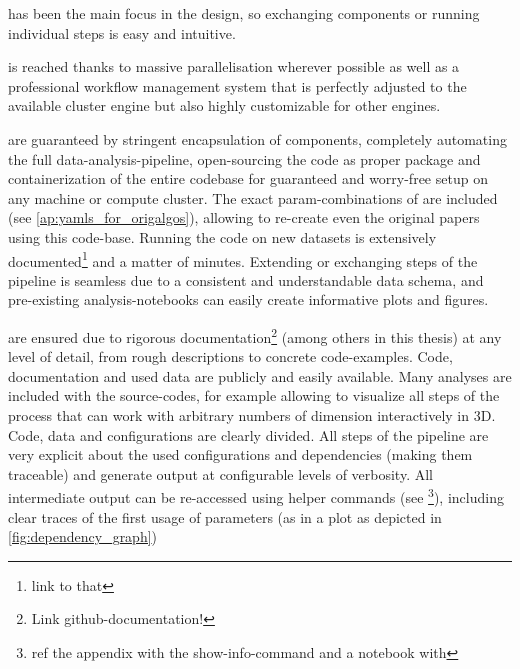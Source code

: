 \begin{description}[style=unboxed]
	\item[Modularity] has been the main focus in the design, so exchanging components or running individual steps is easy and intuitive.
	\item[Scalability] is reached thanks to massive parallelisation wherever possible as well as a professional workflow management system that is perfectly adjusted to the available cluster engine but also highly customizable for other engines.
	\item[Reproducibility and Adaptability] are guaranteed by stringent encapsulation of components, completely automating the full data-analysis-pipeline, open-sourcing the code as proper package and containerization of the entire codebase for guaranteed and worry-free setup on any machine or compute cluster. The exact \gls{param}-combinations of \mainalgos are included (see \autoref{ap:yamls_for_origalgos}), allowing to re-create even the original papers using this code-base. Running the code on new datasets is extensively documented\footnote{ link to that} and a matter of minutes. Extending or exchanging steps of the pipeline is seamless due to a consistent and understandable data schema, and pre-existing analysis-notebooks can easily create informative plots and figures.
	\item[Transparency and Understandability] are ensured due to rigorous documentation\footnote{ Link github-documentation!} (among others in this thesis) at any level of detail, from rough descriptions to concrete code-examples. Code, documentation and used data are publicly and easily available. Many analyses are included with the source-codes, for example allowing to visualize all steps of the process that can work with arbitrary numbers of dimension interactively in 3D. Code, data and configurations are clearly divided. All steps of the pipeline are very explicit about the used configurations and dependencies (making them traceable) and generate output at configurable levels of verbosity. All intermediate output can be re-accessed using helper commands (see \footnote{ ref the appendix with the show-info-command and a notebook with }), including clear traces of the first usage of parameters (as \eg in a plot as depicted in \autoref{fig:dependency_graph})
\end{description}


